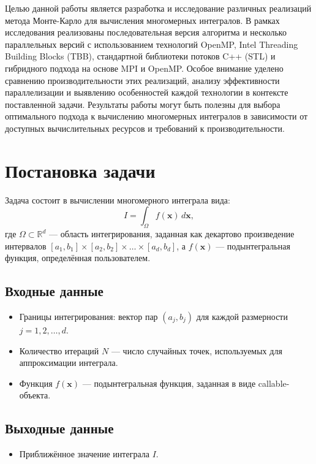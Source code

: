 \documentclass[12pt,a4paper]{extarticle}
\begin{document}
Целью данной работы является разработка и исследование различных реализаций метода Монте-Карло для вычисления многомерных интегралов. В рамках исследования реализованы последовательная версия алгоритма и несколько параллельных версий с использованием технологий OpenMP, Intel Threading Building Blocks (TBB), стандартной библиотеки потоков C++ (STL) и гибридного подхода на основе MPI и OpenMP. Особое внимание уделено сравнению производительности этих реализаций, анализу эффективности параллелизации и выявлению особенностей каждой технологии в контексте поставленной задачи. Результаты работы могут быть полезны для выбора оптимального подхода к вычислению многомерных интегралов в зависимости от доступных вычислительных ресурсов и требований к производительности.

\newpage
\section{Постановка задачи}
Задача состоит в вычислении многомерного интеграла вида:
\[
I = \int_{\Omega} f(\mathbf{x}) \, d\mathbf{x},
\]
где \(\Omega \subset \mathbb{R}^d\) — область интегрирования, заданная как декартово произведение интервалов \([a_1, b_1] \times [a_2, b_2] \times \ldots \times [a_d, b_d]\), а \(f(\mathbf{x})\) — подынтегральная функция, определённая пользователем.

\subsection{Входные данные}
\begin{itemize}
    \item Границы интегрирования: вектор пар \((a_j, b_j)\) для каждой размерности \(j = 1, 2, \ldots, d\).
    \item Количество итераций \(N\) — число случайных точек, используемых для аппроксимации интеграла.
    \item Функция \(f(\mathbf{x})\) — подынтегральная функция, заданная в виде callable-объекта.
\end{itemize}

\subsection{Выходные данные}
\begin{itemize}
    \item Приближённое значение интеграла \(I\).
\end{itemize}
\end{document}
